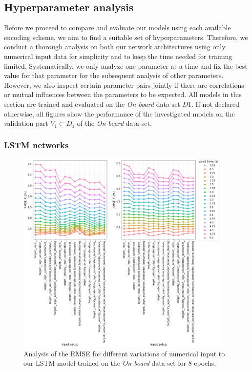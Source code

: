 \subsection{Hyperparameter analysis}
\label{subsec:hyperparam_analysis}
Before we proceed to compare and evaluate our models using each available encoding scheme, we aim to find a suitable set of hyperparameters.
Therefore, we conduct a thorough analysis on both our network architectures using only numerical input data for simplicity and to keep the time needed for training limited.
Systematically, we only analyze one parameter at a time and fix the best value for that parameter for the subsequent analysis of other parameters.
However, we also inspect certain parameter pairs jointly if there are correlations or mutual influences between the parameters to be expected.
All models in this section are trained and evaluated on the \emph{On-board} data-set $D1$.
If not declared otherwise, all figures show the performance of the investigated models on the validation part $V_1 \subset D_1$ of the \emph{On-board} data-set.

\subsubsection{\ac{LSTM} networks}
\label{subsubsec:hyperparam_lstm}

\begin{figure}[t!]
  \centering
  \includegraphics[width=0.95\textwidth]{imgs/lstm_input_data_analysis.eps}
  \caption{Analysis of the \ac{RMSE} for different variations of numerical input to our \ac{LSTM} model trained on the \emph{On-board} data-set for \num{8} epochs.}\label{fig:lstm_input_data_analysis}
\end{figure}


